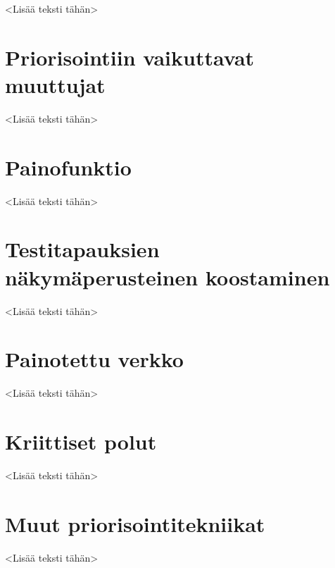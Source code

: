 <Lisää teksti tähän>

\section{Priorisointiin vaikuttavat muuttujat}

<Lisää teksti tähän>

\section{Painofunktio}

<Lisää teksti tähän>

\section{Testitapauksien näkymäperusteinen koostaminen}

<Lisää teksti tähän>

\section{Painotettu verkko}

<Lisää teksti tähän>

\section{Kriittiset polut}

<Lisää teksti tähän>

\section{Muut priorisointitekniikat}

<Lisää teksti tähän>
